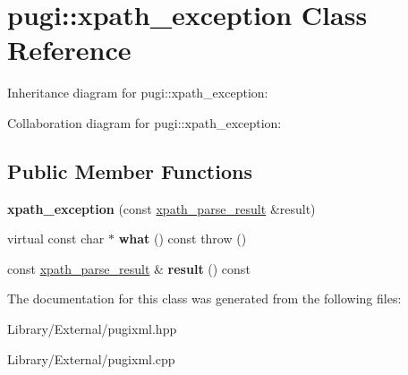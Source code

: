 \hypertarget{classpugi_1_1xpath__exception}{}\section{pugi\+:\+:xpath\+\_\+exception Class Reference}
\label{classpugi_1_1xpath__exception}


Inheritance diagram for pugi\+:\+:xpath\+\_\+exception\+:


Collaboration diagram for pugi\+:\+:xpath\+\_\+exception\+:
\subsection*{Public Member Functions}
\begin{DoxyCompactItemize}
\item 
\hypertarget{classpugi_1_1xpath__exception_a67698821481b5a73213d21a1ac174410}{}{\bfseries xpath\+\_\+exception} (const \hyperlink{structpugi_1_1xpath__parse__result}{xpath\+\_\+parse\+\_\+result} \&result)\label{classpugi_1_1xpath__exception_a67698821481b5a73213d21a1ac174410}

\item 
\hypertarget{classpugi_1_1xpath__exception_a986ab92474fa82507981c76ed115ccbd}{}virtual const char $\ast$ {\bfseries what} () const   throw ()\label{classpugi_1_1xpath__exception_a986ab92474fa82507981c76ed115ccbd}

\item 
\hypertarget{classpugi_1_1xpath__exception_a6602bbd541153f35a44c2233aa7d37de}{}const \hyperlink{structpugi_1_1xpath__parse__result}{xpath\+\_\+parse\+\_\+result} \& {\bfseries result} () const \label{classpugi_1_1xpath__exception_a6602bbd541153f35a44c2233aa7d37de}

\end{DoxyCompactItemize}


The documentation for this class was generated from the following files\+:\begin{DoxyCompactItemize}
\item 
Library/\+External/pugixml.\+hpp\item 
Library/\+External/pugixml.\+cpp\end{DoxyCompactItemize}
